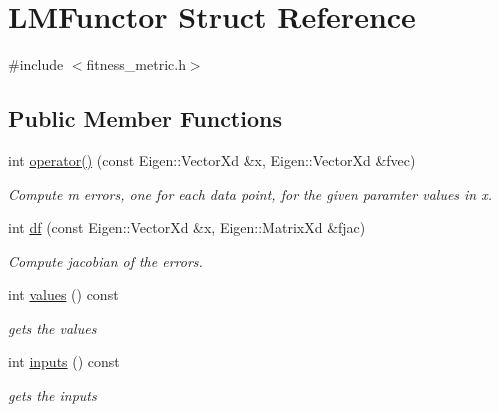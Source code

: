 \hypertarget{structLMFunctor}{}\section{L\+M\+Functor Struct Reference}
\label{structLMFunctor}


{\ttfamily \#include $<$fitness\+\_\+metric.\+h$>$}

\subsection*{Public Member Functions}
\begin{DoxyCompactItemize}
\item 
int \hyperlink{structLMFunctor_ab9272cf916bc55507969dff595743dfe}{operator()} (const Eigen\+::\+Vector\+Xd \&x, Eigen\+::\+Vector\+Xd \&fvec)
\begin{DoxyCompactList}\small\item\em Compute \textquotesingle{}m\textquotesingle{} errors, one for each data point, for the given paramter values in \textquotesingle{}x\textquotesingle{}. \end{DoxyCompactList}\item 
int \hyperlink{structLMFunctor_a0f2edfe1662d360c601caec4332ab60a}{df} (const Eigen\+::\+Vector\+Xd \&x, Eigen\+::\+Matrix\+Xd \&fjac)
\begin{DoxyCompactList}\small\item\em Compute jacobian of the errors. \end{DoxyCompactList}\item 
int \hyperlink{structLMFunctor_a928ebbc0ae61ab4fe5e9ffa0111f38e7}{values} () const 
\begin{DoxyCompactList}\small\item\em gets the values \end{DoxyCompactList}\item 
int \hyperlink{structLMFunctor_af3216685479be9d9c3d7fc5066927d02}{inputs} () const 
\begin{DoxyCompactList}\small\item\em gets the inputs \end{DoxyCompactList}\end{DoxyCompactItemize}
